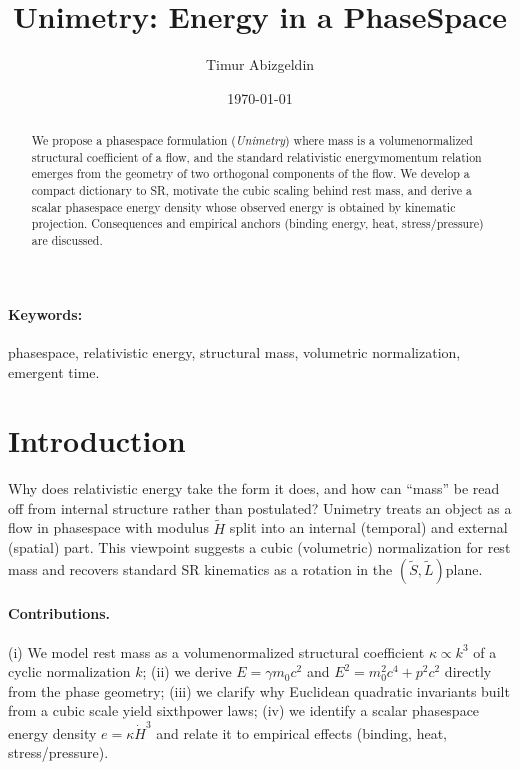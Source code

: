 \documentclass[11pt,a4paper]{article}
\title{Unimetry: Energy in a Phase\textendash Space}
\author{Timur Abizgeldin}
\date{\today}
\newcommand{\tH}{\tilde{H}}
\newcommand{\tS}{\tilde{S}}
\newcommand{\tL}{\tilde{L}}
\begin{document}
\maketitle

\begin{abstract}
We propose a phase\textendash space formulation (\emph{Unimetry}) where mass is a volume\textendash normalized structural coefficient of a flow, and the standard relativistic energy\textendash momentum relation emerges from the geometry of two orthogonal components of the flow. We develop a compact dictionary to SR, motivate the cubic scaling behind rest mass, and derive a scalar phase\textendash space energy density whose observed energy is obtained by kinematic projection. Consequences and empirical anchors (binding energy, heat, stress/pressure) are discussed.
\end{abstract}

\paragraph{Keywords:} phase\textendash space, relativistic energy, structural mass, volumetric normalization, emergent time.

\section{Introduction}
Why does relativistic energy take the form it does, and how can ``mass'' be read off from internal structure rather than postulated? Unimetry treats an object as a flow in phase\textendash space with modulus $\tH$ split into an internal (temporal) and external (spatial) part. This viewpoint suggests a cubic (volumetric) normalization for rest mass and recovers standard SR kinematics as a rotation in the $(\tS,\tL)$\textendash plane.

\paragraph{Contributions.}
(i) We model rest mass as a volume\textendash normalized structural coefficient $\kappa\propto k^3$ of a cyclic normalization $k$; (ii) we derive $E=\gamma m_0 c^2$ and $E^2=m_0^2c^4+p^2c^2$ directly from the phase geometry; (iii) we clarify why Euclidean quadratic invariants built from a cubic scale yield sixth\textendash power laws; (iv) we identify a scalar phase\textendash space energy density $e=\kappa\dot H^3$ and relate it to empirical effects (binding, heat, stress/pressure).
\end{document}

